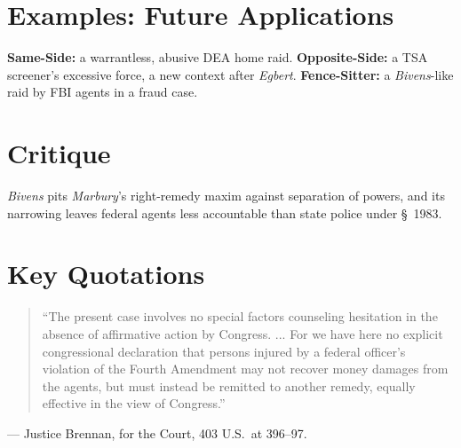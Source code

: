 \documentclass[12pt]{article}
\begin{document}
\section{Examples: Future Applications}
\textbf{Same-Side:} a warrantless, abusive DEA home raid. \textbf{Opposite-Side:} a TSA screener's excessive force, a new context after \textit{Egbert}. \textbf{Fence-Sitter:} a \textit{Bivens}-like raid by FBI agents in a fraud case.

\section{Critique}
\textit{Bivens} pits \textit{Marbury}'s right-remedy maxim against separation of powers, and its narrowing leaves federal agents less accountable than state police under \S~1983.

\section{Key Quotations}
\begin{quote}
``The present case involves no special factors counseling hesitation in the absence of affirmative action by Congress. ... For we have here no explicit congressional declaration that persons injured by a federal officer's violation of the Fourth Amendment may not recover money damages from the agents, but must instead be remitted to another remedy, equally effective in the view of Congress.''
\end{quote}
\noindent --- Justice Brennan, for the Court, 403 U.S.\ at 396--97.
\end{document}
